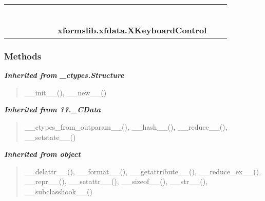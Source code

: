     \label{xformslib:xfdata:XKeyboardControl}
\begin{tabular}{cccccccccc}
\multicolumn{2}{r}{\settowidth{\BCL}{object}\multirow{2}{\BCL}{object}}
&&
&&
&&
  \\\cline{3-3}
  &&\multicolumn{1}{c|}{}
&&
&&
&&
  \\
\multicolumn{4}{r}{\settowidth{\BCL}{??.\_CData}\multirow{2}{\BCL}{??.\_CData}}
&&
&&
  \\\cline{5-5}
  &&&&\multicolumn{1}{c|}{}
&&
&&
  \\
\multicolumn{6}{r}{\settowidth{\BCL}{\_ctypes.Structure}\multirow{2}{\BCL}{\_ctypes.Structure}}
&&
  \\\cline{7-7}
  &&&&&&\multicolumn{1}{c|}{}
&&
  \\
&&&&&&\multicolumn{2}{l}{\textbf{xformslib.xfdata.XKeyboardControl}}
\end{tabular}



  \subsubsection{Methods}


\large{\textbf{\textit{Inherited from \_ctypes.Structure}}}

\begin{quote}
\_\_init\_\_(), \_\_new\_\_()
\end{quote}

\large{\textbf{\textit{Inherited from ??.\_CData}}}

\begin{quote}
\_\_ctypes\_from\_outparam\_\_(), \_\_hash\_\_(), \_\_reduce\_\_(), \_\_setstate\_\_()
\end{quote}

\large{\textbf{\textit{Inherited from object}}}

\begin{quote}
\_\_delattr\_\_(), \_\_format\_\_(), \_\_getattribute\_\_(), \_\_reduce\_ex\_\_(), \_\_repr\_\_(), \_\_setattr\_\_(), \_\_sizeof\_\_(), \_\_str\_\_(), \_\_subclasshook\_\_()
\end{quote}

